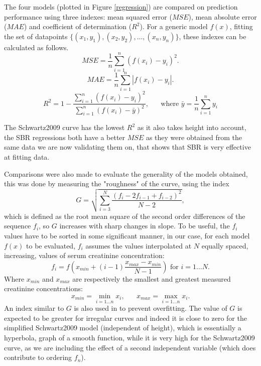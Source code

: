 \documentclass[10pt,final]{siamltex}
\begin{document}
The four models (plotted in Figure \ref{regression}) are compared on prediction performance using three indexes: mean squared error ($MSE$), mean absolute error ($MAE$) and coefficient of determination ($R^2$). For a generic model $f(x)$, fitting the set of datapoints $\lbrace(x_1,y_1), (x_2,y_2), \ldots, (x_n,y_n)\rbrace$, these indexes can be calculated as follows.
$$ MSE = \frac{1}{n}\sum_{i=1}^{n}{(f(x_i)-y_i)^2}.$$
$$ MAE = \frac{1}{n}\sum_{i=1}^{n}{|f(x_i)-y_i|}.$$
$$ R^2 = 1 - \frac{\sum_{i=1}^{n}{(f(x_i)-y_i)^2}}
                  {\sum_{i=1}^{n}{(f(x_i)-\bar{y})^2}}
,\hspace{20pt}\text{where } \bar{y} = \frac{1}{n}\sum_{i=1}^{n}{y_i} $$

The Schwartz2009 curve has the lowest $R^2$ as it also takes height into account, the SBR regressions both have a better $MSE$ as they were obtained from the same data we are now validating them on, that shows that SBR is very effective at fitting data.

Comparisons were also made to evaluate the generality of the models obtained, this was done by measuring the "roughness" of the curve, using the index
$$ G = \sqrt{\sum_{i=3}^{N}{\frac{(f_i-2f_{i-1}+f_{i-2})^2}{N-2}}},$$
which is defined as the root mean square of the second order differences of the sequence $f_i$, so $G$ increases with sharp changes in slope. To be useful, the $f_i$ values have to be sorted in some significant manner, in our case, for each model $f(x)$ to be evaluated, $f_i$ assumes the values interpolated at $N$ equally spaced, increasing, values of serum creatinine concentration:
$$ f_i = f(x_{min} + (i-1)\frac{x_{max}-x_{min}}{N-1}) \text{ for } i = 1 \ldots N.$$
Where $x_{min}$ and $x_{max}$ are respectively the smallest and greatest measured creatinine concentrations:
$$x_{min} = \min_{i = 1 \ldots n}{x_i},\hspace{20pt}x_{max} = \max_{i = 1 \ldots n}{x_i}.$$
An index similar to $G$ is also used in \cite{bishop} to prevent overfitting.
The value of $G$ is expected to be greater for irregular curves and indeed it is close to zero for the simplified Schwartz2009 model (independent of height), which is essentially a hyperbola, graph of a smooth function, while it is very high for the Schwartz2009 curve, as we are including the effect of a second independent variable (which does contribute to ordering $f_n$).
\end{document}
